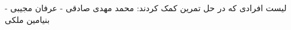\documentclass[]{article}
\begin{document}
\pageheader

\noindent
لیست افرادی که در حل تمرین کمک کردند:
محمد مهدی صادقی - عرفان مجیبی - بنیامین ملکی








\end{document}
